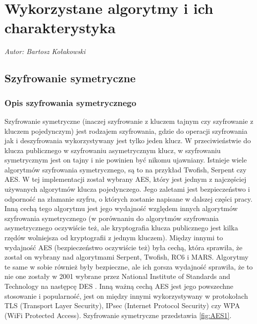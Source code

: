 \chapter{Wykorzystane algorytmy i ich charakterystyka}
\label{chap:Algorytmy}
\textit{Autor: Bartosz Kołakowski}
\section{Szyfrowanie symetryczne}
\label{sec:SzyfrowanieSymetryczne}
\subsection{Opis szyfrowania symetrycznego}
\label{ssec:SzyfrowanieSymetryczneOpis}
Szyfrowanie symetryczne (inaczej szyfrowanie z kluczem tajnym czy szyfrowanie z kluczem pojedynczym) jest rodzajem szyfrowania, gdzie do operacji szyfrowania jak i deszyfrowania wykorzystywany jest tylko jeden klucz. W przeciwieństwie do klucza publicznego w szyfrowaniu asymetrycznym klucz, w szyfrowaniu symetrycznym jest on tajny i nie powinien być nikomu ujawniany. Istnieje wiele algorytmów szyfrowania symetrycznego, są to na przykład Twofish, Serpent czy AES. W tej implementacji został wybrany AES, który jest jednym z najczęściej używanych algorytmów klucza pojedynczego. Jego zaletami jest bezpieczeństwo i odporność na złamanie szyfru, o których zostanie napisane w dalszej części pracy. Inną cechą tego algorytmu jest jego wydajność względem innych algorytmów szyfrowania symetrycznego (w porównaniu do algorytmów szyfrowania asymetrycznego oczywiście też, ale kryptografia klucza publicznego jest kilka rzędów wolniejsza od kryptografii z jednym kluczem). Między innymi to wydajność AES (bezpieczeństwo oczywiście też) była cechą, która sprawiła, że został on wybrany nad algorytmami Serpent, Twofish, RC6 i MARS. Algorytmy te same w sobie również były bezpieczne, ale ich gorsza wydajność sprawiła, że to nie one zostały w 2001 wybrane przez National Institute of Standards and Technology na następcę DES \cite{AESNIST}. Inną ważną cechą AES jest jego powszechne stosowanie i popularność, jest on między innymi wykorzystywany w protokołach TLS (Transport Layer Security), IPsec (Internet Protocol Security) czy WPA (WiFi Protected Access). Szyfrowanie symetryczne przedstawia \figurename{ \ref{fig:AES1}}.

